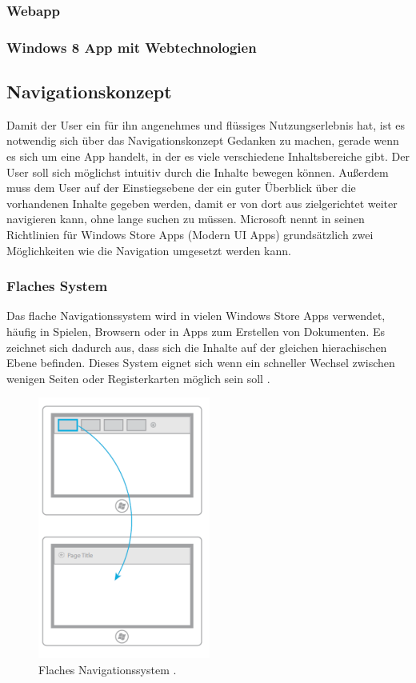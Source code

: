 \documentclass[12pt,a4paper]{scrartcl}
\begin{document}
\subsubsection{Webapp}
\label{subsubsec:webapp} 
 
\subsubsection{Windows 8 App mit Webtechnologien}
\label{subsubsec:webwin8}

\subsection{Navigationskonzept}
\label{subsec:navikonzept}
Damit der User ein für ihn angenehmes und flüssiges Nutzungserlebnis hat, ist es notwendig sich über das Navigationskonzept Gedanken zu machen, gerade wenn es sich um eine App handelt, in der es viele verschiedene Inhaltsbereiche gibt. Der User soll sich möglichst intuitiv durch die Inhalte bewegen können. Außerdem muss dem User auf der Einstiegsebene der ein guter Überblick über die vorhandenen Inhalte gegeben werden, damit er von dort aus zielgerichtet weiter navigieren kann, ohne lange suchen zu müssen. Microsoft nennt in seinen Richtlinien für Windows Store Apps (Modern UI Apps) grundsätzlich zwei Möglichkeiten wie die Navigation umgesetzt werden kann.

\subsubsection{Flaches System}
\label{subsubsec:flachessystem}
Das flache Navigationssystem wird in vielen Windows Store Apps verwendet, häufig in Spielen, Browsern oder in Apps zum Erstellen von Dokumenten. Es zeichnet sich dadurch aus, dass sich die Inhalte auf der gleichen hierachischen Ebene befinden. Dieses System eignet sich wenn ein schneller Wechsel zwischen wenigen Seiten oder Registerkarten möglich sein soll \citep{MicrosoftNavidesign2013}.

\begin{figure}[h]	
	\centering
	\includegraphics[scale=1]{Bilder/Abbildungen/ms_navigation_flach} 
	\caption{Flaches Navigationssystem \protect\citep{MicrosoftNavidesign2013}.}
	\label{fig:naviflach}
\end{figure}
\end{document}
